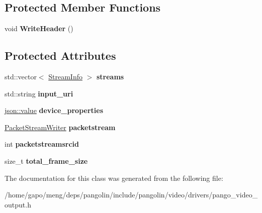 \subsection*{Protected Member Functions}
\begin{DoxyCompactItemize}
\item 
void {\bfseries Write\+Header} ()\hypertarget{classpangolin_1_1_pango_video_output_acf9b87c98d03f3305a20deaf43f7d9c5}{}\label{classpangolin_1_1_pango_video_output_acf9b87c98d03f3305a20deaf43f7d9c5}

\end{DoxyCompactItemize}
\subsection*{Protected Attributes}
\begin{DoxyCompactItemize}
\item 
std\+::vector$<$ \hyperlink{classpangolin_1_1_stream_info}{Stream\+Info} $>$ {\bfseries streams}\hypertarget{classpangolin_1_1_pango_video_output_ae873edc5549ace0762cc521040984dc2}{}\label{classpangolin_1_1_pango_video_output_ae873edc5549ace0762cc521040984dc2}

\item 
std\+::string {\bfseries input\+\_\+uri}\hypertarget{classpangolin_1_1_pango_video_output_adb0087393170be08d938f64f182e8cc9}{}\label{classpangolin_1_1_pango_video_output_adb0087393170be08d938f64f182e8cc9}

\item 
\hyperlink{classpangolin_1_1json_1_1value}{json\+::value} {\bfseries device\+\_\+properties}\hypertarget{classpangolin_1_1_pango_video_output_a04736e7c26993f17fdc02e2ff1f44eeb}{}\label{classpangolin_1_1_pango_video_output_a04736e7c26993f17fdc02e2ff1f44eeb}

\item 
\hyperlink{classpangolin_1_1_packet_stream_writer}{Packet\+Stream\+Writer} {\bfseries packetstream}\hypertarget{classpangolin_1_1_pango_video_output_ac0a01e6bb235387ade3c258e36f43b84}{}\label{classpangolin_1_1_pango_video_output_ac0a01e6bb235387ade3c258e36f43b84}

\item 
int {\bfseries packetstreamsrcid}\hypertarget{classpangolin_1_1_pango_video_output_abb9eecefc2aed72a623760a48765374c}{}\label{classpangolin_1_1_pango_video_output_abb9eecefc2aed72a623760a48765374c}

\item 
size\+\_\+t {\bfseries total\+\_\+frame\+\_\+size}\hypertarget{classpangolin_1_1_pango_video_output_abb26b19fd1e68fd35f5f85f68337aade}{}\label{classpangolin_1_1_pango_video_output_abb26b19fd1e68fd35f5f85f68337aade}

\end{DoxyCompactItemize}


The documentation for this class was generated from the following file\+:\begin{DoxyCompactItemize}
\item 
/home/gapo/meng/deps/pangolin/include/pangolin/video/drivers/pango\+\_\+video\+\_\+output.\+h\end{DoxyCompactItemize}
